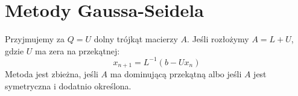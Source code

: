 \section{Metody Gaussa-Seidela}
Przyjmujemy za \( Q = U \) dolny trójkąt macierzy \( A \). Jeśli rozłożymy \( A = L + U \), gdzie \( U \) ma zera na przekątnej:
\[
    x_{n+1} = L^{-1}(b - Ux_n)
\]
Metoda jest zbieżna, jeśli \( A \) ma dominującą przekątną albo jeśli \( A \) jest symetryczna i dodatnio określona.
